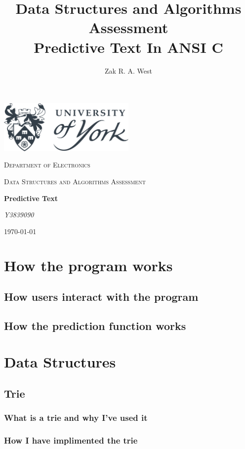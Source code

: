 \documentclass[11pt]{article} %
\title{
	Data Structures and Algorithms Assessment \\
	\large Predictive Text In ANSI C
}
\author{Zak R. A. West}
\begin{document}
\begin{titlepage}
	\centering
	\includegraphics[width=0.5\textwidth]{UoY_logo}\par\vspace{1cm}
	{\scshape\LARGE Department of Electronics \par}
	\vspace{1cm}
	{\scshape\Large Data Structures and Algorithms Assessment \par}
	\vspace{1.5cm}
	{\huge\bfseries Predictive Text\par}


	\vfill
	{\Large\itshape Y3839090\par}
	\vspace{2cm}
	{\large \today\par}
\end{titlepage}

\section{How the program works}

	\subsection{How users interact with the program}
	\subsection{How the prediction function works}

\section{Data Structures}
	\subsection{Trie}
		\subsubsection{What is a trie and why I've used it}
		\subsubsection{How I have implimented the trie}
\end{document}
